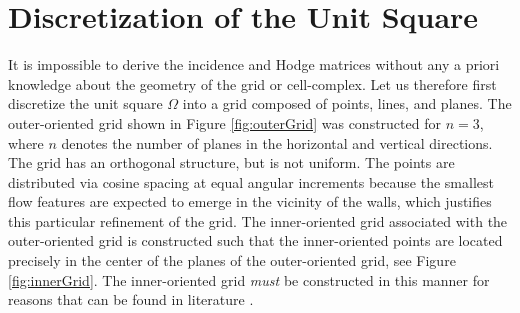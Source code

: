 \section{Discretization of the Unit Square}
\label{sec:discretization}

It is impossible to derive the incidence and Hodge matrices without any a priori knowledge about the geometry of the grid or cell-complex. Let us therefore first discretize the unit square $\Omega$ into a grid composed of points, lines, and planes. The outer-oriented grid shown in Figure \ref{fig:outerGrid} was constructed for $n = 3$, where $n$ denotes the number of planes in the horizontal and vertical directions. The grid has an orthogonal structure, but is not uniform. The points are distributed via cosine spacing at equal angular increments because the smallest flow features are expected to emerge in the vicinity of the walls, which justifies this particular refinement of the grid. The inner-oriented grid associated with the outer-oriented grid is constructed such that the inner-oriented points are located precisely in the center of the planes of the outer-oriented grid, see Figure \ref{fig:innerGrid}. The inner-oriented grid \emph{must} be constructed in this manner for reasons that can be found in literature \parencite{hirani2003discrete}.

